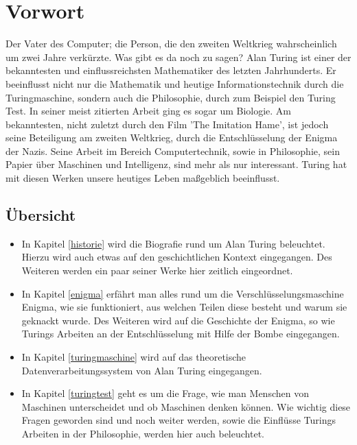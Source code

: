 \section{Vorwort}
Der Vater des Computer; die Person, die den zweiten Weltkrieg wahrscheinlich um zwei Jahre verkürzte. Was gibt es da noch zu sagen? Alan Turing ist einer der bekanntesten und einflussreichsten Mathematiker des letzten Jahrhunderts. Er beeinflusst nicht nur die Mathematik und heutige Informationstechnik durch die Turingmaschine, sondern auch die Philosophie, durch zum Beispiel den Turing Test. In seiner meist zitierten Arbeit ging es sogar um Biologie. Am bekanntesten, nicht zuletzt durch den Film 'The Imitation Hame', ist jedoch seine Beteiligung am zweiten Weltkrieg, durch die Entschlüsselung der Enigma der Nazis. Seine Arbeit im Bereich Computertechnik, sowie in Philosophie, sein Papier über Maschinen und Intelligenz, sind mehr als nur interessant. Turing hat mit diesen Werken unsere heutiges Leben maßgeblich beeinflusst.

\subsection{Übersicht}
\begin{itemize}
	\item In Kapitel \ref{historie} wird die Biografie rund um Alan Turing beleuchtet. Hierzu wird auch etwas auf den geschichtlichen Kontext eingegangen. Des Weiteren werden ein paar seiner Werke hier zeitlich eingeordnet.
	\item In Kapitel \ref{enigma} erfährt man alles rund um die Verschlüsselungsmaschine Enigma, wie sie funktioniert, aus welchen Teilen diese besteht und warum sie geknackt wurde. Des Weiteren wird auf die Geschichte der Enigma, so wie Turings Arbeiten an der Entschlüsselung mit Hilfe der Bombe eingegangen.
	\item In Kapitel \ref{turingmaschine} wird auf das theoretische Datenverarbeitungssystem von Alan Turing eingegangen.
	\item In Kapitel \ref{turingtest} geht es um die Frage, wie man Menschen von Maschinen unterscheidet und ob Maschinen denken können. Wie wichtig diese Fragen geworden sind und noch weiter werden, sowie die Einflüsse Turings Arbeiten in der Philosophie, werden hier auch beleuchtet.
\end{itemize}
